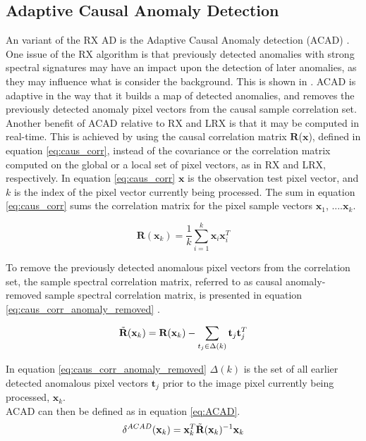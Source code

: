 \subsection{Adaptive Causal Anomaly Detection}
\label{sec:ACAD_theory}
An variant of the RX AD is the Adaptive Causal Anomaly detection (ACAD) \cite{chang2006characterization}. One issue of the RX algorithm is that previously detected anomalies with strong spectral signatures may have an impact upon the detection of later anomalies, as they may influence what is consider the background. This is shown in \cite{chang2006characterization}. ACAD is adaptive in the way that it builds a map of detected anomalies, and removes the previously detected anomaly pixel vectors from the causal sample correlation set. \\
Another benefit of ACAD relative to RX and LRX is that it may be computed in real-time. This is achieved by using the causal correlation matrix $\textbf{R}$($\textbf{x}$), defined in equation \ref{eq:caus_corr}, instead of the covariance or the correlation matrix computed on the global or a local set of pixel vectors, as in RX and LRX, respectively. In equation \ref{eq:caus_corr} $\textbf{x}$ is the observation test pixel vector, and $k$ is the index of the pixel vector currently being processed. The sum in equation \ref{eq:caus_corr} sums the correlation matrix for the pixel sample vectors {$\textbf{x}_1$, ....$\textbf{x}_k$}.  

\begin{equation}
    \textbf{R}(\textbf{x}_k)=\frac{1}{k}\sum_{i=1}^k\textbf{x}_i\textbf{x}_i^T
    \label{eq:caus_corr}
\end{equation}

To remove the previously detected anomalous pixel vectors from the correlation set, the sample spectral correlation matrix, referred to as causal anomaly-removed sample spectral correlation matrix, is presented in equation \ref{eq:caus_corr_anomaly_removed} \cite{chang2006characterization}.

\begin{equation}
    \Tilde{\textbf{R}}(\textbf{x}_k)= \textbf{R}(\textbf{x}_k) - \sum_{t_j\in\Delta(k)}\textbf{t}_j\textbf{t}_j^T
    \label{eq:caus_corr_anomaly_removed}
\end{equation}

In equation \ref{eq:caus_corr_anomaly_removed} $\Delta(k)$ is the set of all earlier detected anomalous pixel vectors $\textbf{t}_j$ prior to the image pixel currently being processed, $\textbf{x}_k$.
\\
ACAD can then be defined as in equation \ref{eq:ACAD}.
\begin{equation}
    \delta^{ACAD}(\textbf{x}_k)= \textbf{x}_k^T\Tilde{\textbf{R}}(\textbf{x}_k)^{-1}\textbf{x}_k
    \label{eq:ACAD}
\end{equation}


